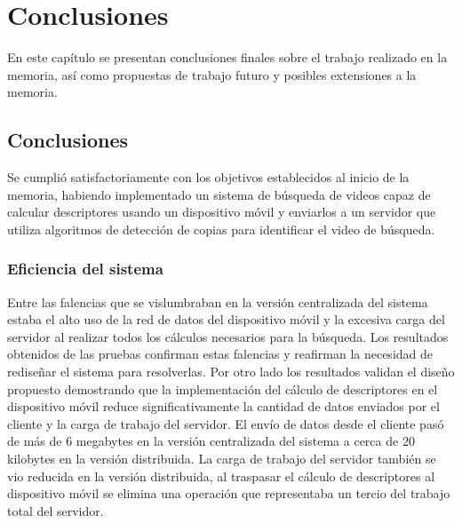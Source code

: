 
\chapter{Conclusiones}\label{cap_conclusiones}
En este capítulo se presentan conclusiones finales sobre el trabajo realizado en la memoria, así como propuestas de trabajo futuro y posibles extensiones a la memoria.

\section{Conclusiones}\label{conclusiones}

Se cumplió satisfactoriamente con los objetivos establecidos al inicio de la memoria, habiendo implementado un sistema de búsqueda de videos capaz de calcular descriptores usando un dispositivo móvil y enviarlos a un servidor que utiliza algoritmos de detección de copias para identificar el video de búsqueda.

\subsection*{Eficiencia del sistema}
Entre las falencias que se vislumbraban en la versión centralizada del sistema estaba el alto uso de la red de datos del dispositivo móvil y la excesiva carga del servidor al realizar todos los cálculos necesarios para la búsqueda. Los resultados obtenidos de las pruebas confirman estas falencias y reafirman la necesidad de rediseñar el sistema para resolverlas. Por otro lado los resultados validan el diseño propuesto demostrando que la implementación del cálculo de descriptores en el dispositivo móvil reduce significativamente la cantidad de datos enviados por el cliente y la carga de trabajo del servidor. El envío de datos desde el cliente pasó de más de 6 megabytes en la versión centralizada del sistema a cerca de 20 kilobytes en la versión distribuida. La carga de trabajo del servidor también se vio reducida en la versión distribuida, al traspasar el cálculo de descriptores al dispositivo móvil se elimina una operación que representaba un tercio del trabajo total del servidor.

